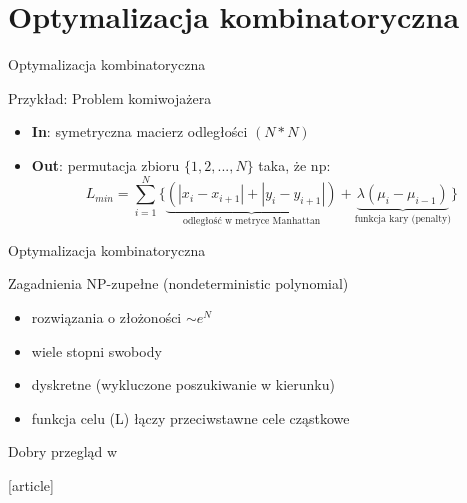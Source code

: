 \section{Optymalizacja kombinatoryczna}

	\begin{frame}{Optymalizacja kombinatoryczna }
		\begin{exampleblock}{Przykład: Problem komiwojażera}
			\begin{itemize}
				\item \textbf{In}: symetryczna macierz odległości $(N*N)$

				\item \textbf{Out}: permutacja zbioru $\{1,2,...,N\}$ taka, że np:
					$$
						L_{min} = \sum_{i=1}^N \{ \underbrace{(|x_i - x_{i+1}| + |y_i - y_{i+1}|)}_\text{odległość w metryce Manhattan} + \underbrace{\lambda(\mu_i - \mu_{i-1})}_\text{funkcja kary (penalty)}\}
					$$
			\end{itemize}
		\end{exampleblock}

	\end{frame}

	\begin{frame}{Optymalizacja kombinatoryczna}
		\begin{exampleblock}{Zagadnienia NP-zupełne (nondeterministic polynomial)}
			\begin{itemize}
				\item rozwiązania o złożoności $\sim e^N$
				\item wiele stopni swobody
				\item dyskretne (wykluczone poszukiwanie w kierunku)
				\item funkcja celu (L) łączy przeciwstawne cele cząstkowe
			\end{itemize}
		\end{exampleblock}
		Dobry przegląd w \cite{garey}
		\begin{thebibliography}{9}
		\end{thebibliography}
	\end{frame}

